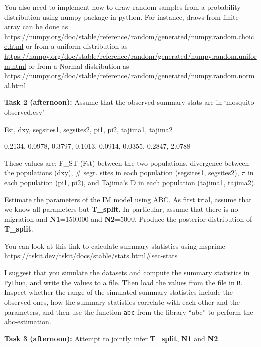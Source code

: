 \documentclass[11pt]{article}
\begin{document}
You also need to implement how to draw random samples from a probability distribution using numpy package in python. For instance, draws from finite array can be done as\\
\url{https://numpy.org/doc/stable/reference/random/generated/numpy.random.choice.html} or from a uniform distribution as\\
\url{https://numpy.org/doc/stable/reference/random/generated/numpy.random.uniform.html} or from a Normal distribution as\\
\url{https://numpy.org/doc/stable/reference/random/generated/numpy.random.normal.html}

\textbf{Task 2 (afternoon):} Assume that the observed summary stats are in `mosquito-observed.csv'

Fst, dxy, segsites1, segsites2, pi1, pi2, tajima1, tajima2

0.2134, 0.0978, 0.3797, 0.1013, 0.0914, 0.0355, 0.2847, 2.0788

These values are: F\_ST (Fst) between the two populations, divergence between the populations (dxy), \# segr. sites in each population (segsites1, segsites2), $\pi$ in each population (pi1, pi2), and Tajima's D in each population (tajima1, tajima2).

Estimate the parameters of the IM model using ABC. As first trial, assume that we know all parameters but \textbf{T\_split}. In particular, assume that there is no migration and \textbf{N1}=150,000 and \textbf{N2}=5000. Produce the posterior distribution of \textbf{T\_split}.

You can look at this link to calculate summary statistics using msprime\\
\url{https://tskit.dev/tskit/docs/stable/stats.html#sec-stats}

I suggest that you simulate the datasets and compute the summary statistics in \texttt{Python}, and write the values to a file. Then load the values from the file in \texttt{R}. Inspect whether the range of the simulated summary statistics include the observed ones, how the summary statistics correlate with each other and the parameters, and then use the function \texttt{abc} from the library ``abc'' to perform the abc-estimation.

\textbf{Task 3 (afternoon):} Attempt to jointly infer \textbf{T\_split}, \textbf{N1} and \textbf{N2}.
\end{document}

